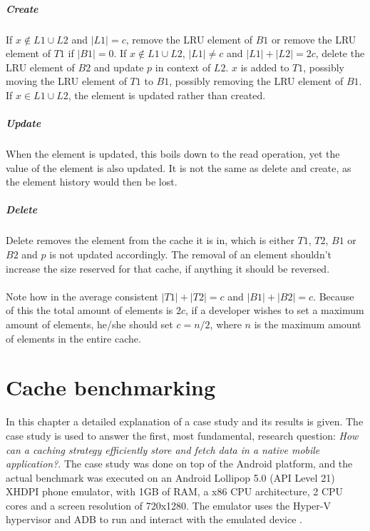 \documentclass[pdftex,a4paper,12pt,twoside]{report}
\begin{document}
\paragraph{Create} If $x \not \in L1 \cup L2$ and $\left\vert{L1}\right\vert = c$, remove the LRU element of $B1$ or remove the LRU element of $T1$ if $\left\vert{B1}\right\vert = 0$. If $x \not \in L1 \cup L2$, $\left\vert{L1}\right\vert \neq c$ and $\left\vert{L1}\right\vert + \left\vert{L2}\right\vert = 2c$, delete the LRU element of $B2$ and update $p$ in context of $L2$. $x$ is added to $T1$, possibly moving the LRU element of $T1$ to $B1$, possibly removing the LRU element of $B1$. If $x \in L1 \cup L2$, the element is updated rather than created.
\paragraph{Update} When the element is updated, this boils down to the read operation, yet the value of the element is also updated. It is not the same as delete and create, as the element history would then be lost.
\paragraph{Delete} Delete removes the element from the cache it is in, which is either $T1$, $T2$, $B1$ or $B2$ and $p$ is not updated accordingly. The removal of an element shouldn't increase the size reserved for that cache, if anything it should be reversed.
\\\\
\citep{megiddo2004outperforming} Note how in the average consistent $\left\vert{T1}\right\vert + \left\vert{T2}\right\vert = c$ and $\left\vert{B1}\right\vert + \left\vert{B2}\right\vert = c$. Because of this the total amount of elements is $2c$, if a developer wishes to set a maximum amount of elements, he/she should set $c = n / 2$, where $n$ is the maximum amount of elements in the entire cache.
\chapter{Cache benchmarking}
In this chapter a detailed explanation of a case study and its results is given. The case study is used to answer the first, most fundamental, research question: \emph{How can a caching strategy efficiently store and fetch data in a native mobile application?}.
The case study was done on top of the Android platform, and the actual benchmark was executed on an Android Lollipop 5.0 (API Level 21) XHDPI phone emulator, with 1GB of RAM, a x86 CPU architecture, 2 CPU cores and a screen resolution of 720x1280. The emulator uses the Hyper-V hypervisor and ADB to run and interact with the emulated device \citep{visual_studio_emulator}.
\end{document}
